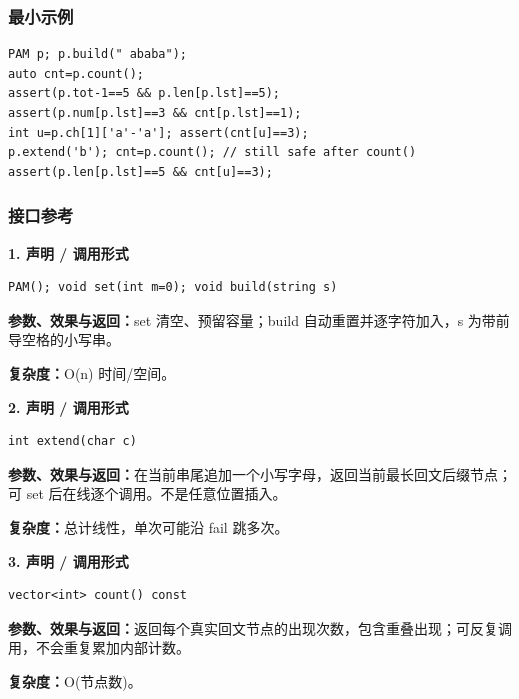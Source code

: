 \documentclass[UTF8,a4paper,10pt]{ctexart}
\begin{document}
\subsubsection*{最小示例}
\begin{lstlisting}
PAM p; p.build(" ababa");
auto cnt=p.count();
assert(p.tot-1==5 && p.len[p.lst]==5);
assert(p.num[p.lst]==3 && cnt[p.lst]==1);
int u=p.ch[1]['a'-'a']; assert(cnt[u]==3);
p.extend('b'); cnt=p.count(); // still safe after count()
assert(p.len[p.lst]==5 && cnt[u]==3);
\end{lstlisting}
\subsubsection*{接口参考}
\noindent\begin{minipage}{\textwidth}
\textbf{1. 声明 / 调用形式}
\begin{lstlisting}
PAM(); void set(int m=0); void build(string s)
\end{lstlisting}
\textbf{参数、效果与返回：}set 清空、预留容量；build 自动重置并逐字符加入，s 为带前导空格的小写串。

\textbf{复杂度：}O(n) 时间/空间。

\end{minipage}\par\vspace{0.4em}
\noindent\begin{minipage}{\textwidth}
\textbf{2. 声明 / 调用形式}
\begin{lstlisting}
int extend(char c)
\end{lstlisting}
\textbf{参数、效果与返回：}在当前串尾追加一个小写字母，返回当前最长回文后缀节点；可 set 后在线逐个调用。不是任意位置插入。

\textbf{复杂度：}总计线性，单次可能沿 fail 跳多次。

\end{minipage}\par\vspace{0.4em}
\noindent\begin{minipage}{\textwidth}
\textbf{3. 声明 / 调用形式}
\begin{lstlisting}
vector<int> count() const
\end{lstlisting}
\textbf{参数、效果与返回：}返回每个真实回文节点的出现次数，包含重叠出现；可反复调用，不会重复累加内部计数。

\textbf{复杂度：}O(节点数)。

\end{minipage}\par\vspace{0.4em}
\end{document}
